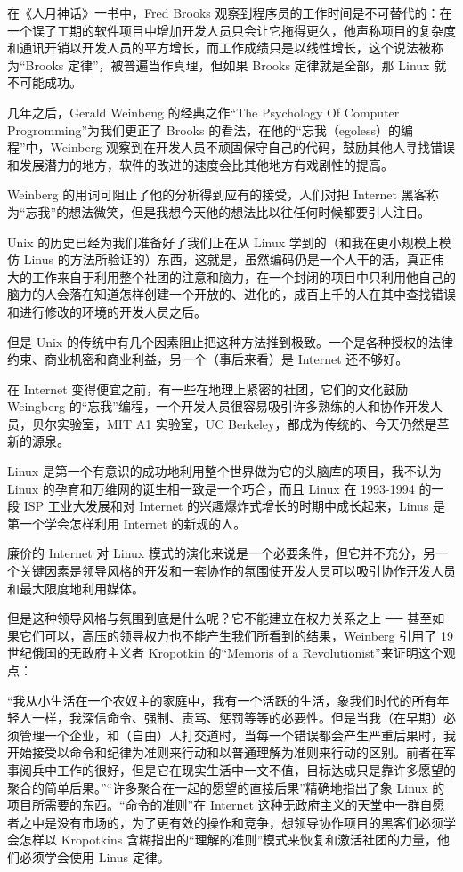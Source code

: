 在《人月神话》一书中，Fred Brooks 观察到程序员的工作时间是不可替代的：在一个误了工期的软件项目中增加开发人员只会让它拖得更久，他声称项目的复杂度和通讯开销以开发人员的平方增长，而工作成绩只是以线性增长，这个说法被称为“Brooks 定律”，被普遍当作真理，但如果 Brooks 定律就是全部，那 Linux 就不可能成功。


几年之后，Gerald Weinbeng 的经典之作“The Psychology Of Computer Progromming”为我们更正了 Brooks 的看法，在他的“忘我（egoless）的编程”中，Weinberg 观察到在开发人员不顽固保守自己的代码，鼓励其他人寻找错误和发展潜力的地方，软件的改进的速度会比其他地方有戏剧性的提高。


Weinberg 的用词可阻止了他的分析得到应有的接受，人们对把 Internet 黑客称为“忘我”的想法微笑，但是我想今天他的想法比以往任何时候都要引人注目。


Unix 的历史已经为我们准备好了我们正在从 Linux 学到的（和我在更小规模上模仿 Linus 的方法所验证的）东西，这就是，虽然编码仍是一个人干的活，真正伟大的工作来自于利用整个社团的注意和脑力，在一个封闭的项目中只利用他自己的脑力的人会落在知道怎样创建一个开放的、进化的，成百上千的人在其中查找错误和进行修改的环境的开发人员之后。


但是 Unix 的传统中有几个因素阻止把这种方法推到极致。一个是各种授权的法律约束、商业机密和商业利益，另一个（事后来看）是 Internet 还不够好。


在 Internet 变得便宜之前，有一些在地理上紧密的社团，它们的文化鼓励 Weingberg 的“忘我”编程，一个开发人员很容易吸引许多熟练的人和协作开发人员，贝尔实验室，MIT A1 实验室，UC Berkeley，都成为传统的、今天仍然是革新的源泉。


Linux 是第一个有意识的成功地利用整个世界做为它的头脑库的项目，我不认为 Linux 的孕育和万维网的诞生相一致是一个巧合，而且 Linux 在 1993-1994 的一段 ISP 工业大发展和对 Internet 的兴趣爆炸式增长的时期中成长起来，Linus 是第一个学会怎样利用 Internet 的新规的人。


廉价的 Internet 对 Linux 模式的演化来说是一个必要条件，但它并不充分，另一个关键因素是领导风格的开发和一套协作的氛围使开发人员可以吸引协作开发人员和最大限度地利用媒体。


但是这种领导风格与氛围到底是什么呢？它不能建立在权力关系之上 ──  甚至如果它们可以，高压的领导权力也不能产生我们所看到的结果，Weinberg 引用了 19 世纪俄国的无政府主义者 Kropotkin 的“Memoris of a Revolutionist”来证明这个观点：


“我从小生活在一个农奴主的家庭中，我有一个活跃的生活，象我们时代的所有年轻人一样，我深信命令、强制、责骂、惩罚等等的必要性。但是当我（在早期）必须管理一个企业，和（自由）人打交道时，当每一个错误都会产生严重后果时，我开始接受以命令和纪律为准则来行动和以普通理解为准则来行动的区别。前者在军事阅兵中工作的很好，但是它在现实生活中一文不值，目标达成只是靠许多愿望的聚合的简单后果。”“许多聚合在一起的愿望的直接后果”精确地指出了象 Linux 的项目所需要的东西。“命令的准则”在 Internet 这种无政府主义的天堂中一群自愿者之中是没有市场的，为了更有效的操作和竞争，想领导协作项目的黑客们必须学会怎样以 Kropotkins 含糊指出的“理解的准则”模式来恢复和激活社团的力量，他们必须学会使用 Linus 定律。


